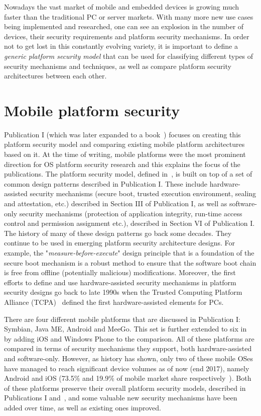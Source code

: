 
Nowadays the vast market of mobile and embedded devices is growing much faster than the traditional PC or server markets. With many more new use cases being implemented and researched, one can see an explosion in the number of devices, their security requirements and platform security mechanisms. In order not to get lost in this constantly evolving variety, it is important to define a \textit{generic platform security model} that can be used for classifying different types of security mechanisms and techniques, as well as compare platform security architectures between each other. 

\section{Mobile platform security}

Publication I (which was later expanded to a book~\cite{2013Asokan}) focuses on creating this platform security model and comparing existing mobile platform architectures based on it. At the time of writing, mobile platforms were the most prominent direction for OS platform security research and this explains the focus of the publications. The platform security model, defined in~\cite{2013Asokan}, is built on top of a set of common design patterns described in Publication I. These include hardware-assisted security mechanisms (secure boot, trusted execution environment, sealing and attestation, etc.) described in Section III of Publication I, as well as software-only security mechanisms (protection of application integrity, run-time access control and permission assignment etc.), described in Section VI of Publication I. The history of many of these design patterns go back some decades. They continue to be used in emerging platform security architecture designs. For example, the "\textit{measure-before-execute}" design principle that is a foundation of the secure boot mechanism is a robust method to ensure that the software boot chain is free from offline (potentially malicious) modifications. Moreover, the first efforts to define and use hardware-assisted security mechanisms in platform security designs go back to late 1990s when the Trusted Computing Platform Alliance (TCPA)~\cite{pearson2002} defined the first hardware-assisted elements for PCs.

There are four different mobile platforms that are discussed in Publication I: Symbian, Java ME, Android and MeeGo. This set is further extended to six in~\cite{2013Asokan} by adding iOS and Windows Phone to the comparison. All of these platforms are compared in terms of security mechanisms they support, both hardware-assisted and software-only. However, as history has shown, only two of these mobile OSes have managed to reach significant device volumes as of now (end 2017), namely Android and iOS (73.5\% and 19.9\% of mobile market share respectively~\cite{osshare}). Both of these platforms preserve their overall platform security models, described in Publications I and~\cite{2013Asokan}, and some valuable new security mechanisms have been added over time, as well as existing ones improved. 

